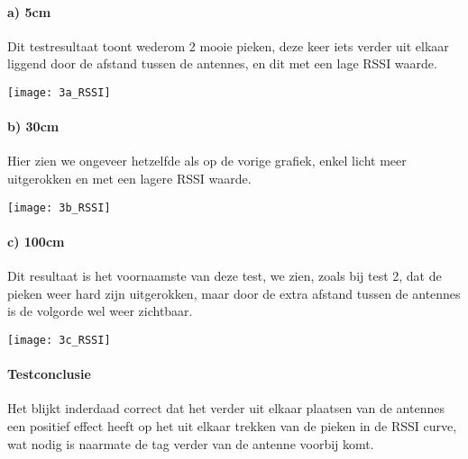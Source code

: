 \paragraph{a) 5cm}
\begin{minipage}{0.55\textwidth}
Dit testresultaat toont wederom 2 mooie pieken, deze keer iets verder uit elkaar liggend door de afstand tussen de antennes, en dit met een lage RSSI waarde.
\end{minipage}
\hfill
\begin{minipage}{0.42\textwidth}
	\texttt{[image: 3a\_RSSI]}
	\label{fig:ond-rfid-static-3a-res}
\end{minipage}

\paragraph{b) 30cm}
\begin{minipage}{0.55\textwidth}
Hier zien we ongeveer hetzelfde als op de vorige grafiek, enkel licht meer uitgerokken en met een lagere RSSI waarde.
\end{minipage}
\hfill
\begin{minipage}{0.42\textwidth}
	\texttt{[image: 3b\_RSSI]}
	\label{fig:ond-rfid-static-3b-res}
\end{minipage}

\paragraph{c) 100cm}
\begin{minipage}{0.55\textwidth}
Dit resultaat is het voornaamste van deze test, we zien, zoals bij test 2, dat de pieken weer hard zijn uitgerokken, maar door de extra afstand tussen de antennes is de volgorde wel weer zichtbaar.
\end{minipage}
\hfill
\begin{minipage}{0.42\textwidth}
	\texttt{[image: 3c\_RSSI]}
	\label{fig:ond-rfid-static-3c-res}
\end{minipage}

\paragraph{Testconclusie}
Het blijkt inderdaad correct dat het verder uit elkaar plaatsen van de antennes een positief effect heeft op het uit elkaar trekken van de pieken in de RSSI curve, wat nodig is naarmate de tag verder van de antenne voorbij komt.

